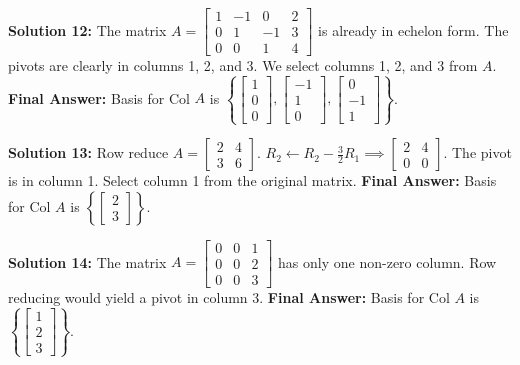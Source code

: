 \documentclass[11pt]{article}
\begin{document}
\vspace{0.5cm}
\textbf{Solution 12:}
The matrix $A = \begin{bmatrix} 1 & -1 & 0 & 2 \\ 0 & 1 & -1 & 3 \\ 0 & 0 & 1 & 4 \end{bmatrix}$ is already in echelon form. The pivots are clearly in columns 1, 2, and 3. We select columns 1, 2, and 3 from $A$.
\textbf{Final Answer:} Basis for Col $A$ is $\left\{ \begin{bmatrix} 1 \\ 0 \\ 0 \end{bmatrix}, \begin{bmatrix} -1 \\ 1 \\ 0 \end{bmatrix}, \begin{bmatrix} 0 \\ -1 \\ 1 \end{bmatrix} \right\}$.

\vspace{0.5cm}
\textbf{Solution 13:}
Row reduce $A = \begin{bmatrix} 2 & 4 \\ 3 & 6 \end{bmatrix}$.
$R_2 \leftarrow R_2 - \frac{3}{2}R_1 \implies \begin{bmatrix} 2 & 4 \\ 0 & 0 \end{bmatrix}$.
The pivot is in column 1. Select column 1 from the original matrix.
\textbf{Final Answer:} Basis for Col $A$ is $\left\{ \begin{bmatrix} 2 \\ 3 \end{bmatrix} \right\}$.

\vspace{0.5cm}
\textbf{Solution 14:}
The matrix $A = \begin{bmatrix} 0 & 0 & 1 \\ 0 & 0 & 2 \\ 0 & 0 & 3 \end{bmatrix}$ has only one non-zero column. Row reducing would yield a pivot in column 3.
\textbf{Final Answer:} Basis for Col $A$ is $\left\{ \begin{bmatrix} 1 \\ 2 \\ 3 \end{bmatrix} \right\}$.
\end{document}
